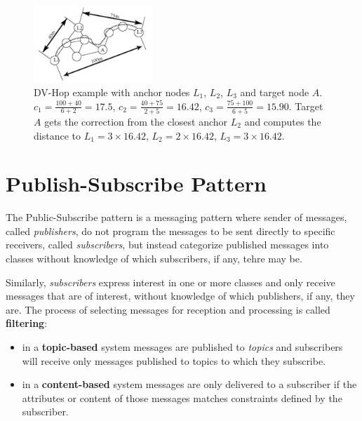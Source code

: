 \documentclass[a4paper,12pt]{article}
\begin{document}
\begin{enumerate}[label=(\alph*)]
\begin{enumerate}[label=(\roman*)]
    \begin{figure}[t]
      \centering
      \includegraphics[width=0.4\textwidth]{img/dv-hop}
      \caption{\label{fig:dv-hop}DV-Hop example with anchor nodes $L_1$, $L_2$, $L_3$ and target node $A$. $c_1 = \frac{100+40}{6+2} = 17.5$, $c_2 = \frac{40+75}{2+5} = 16.42$, $c_3 = \frac{75+100}{6+5} = 15.90$. Target $A$ gets the correction from the closest anchor $L_2$ and computes the distance to $L_1 = 3 \times 16.42$, $L_2 = 2 \times 16.42$, $L_3 = 3 \times 16.42$.}
    \end{figure}
  \end{enumerate}
\end{enumerate}

\newpage

\section{Publish-Subscribe Pattern}
The Public-Subscribe pattern is a messaging pattern where sender of messages, called \textit{publishers}, do not program the messages to be sent directly to specific receivers, called \textit{subscribers}, but instead categorize published messages into classes without knowledge of which subscribers, if any, tehre may be.

Similarly, \textit{subscribers} express interest in one or more classes and only receive messages that are of interest, without knowledge of which publishers, if any, they are. The process of selecting messages for reception and processing is called \textbf{filtering}:
\begin{itemize}
  \item in a \textbf{topic-based} system messages are published to \textit{topics} and subscribers will receive only messages published to topics to which they subscribe.
  \item in a \textbf{content-based} system messages are only delivered to a subscriber if the attributes or content of those messages matches constraints defined by the subscriber.
\end{itemize}
\end{document}
